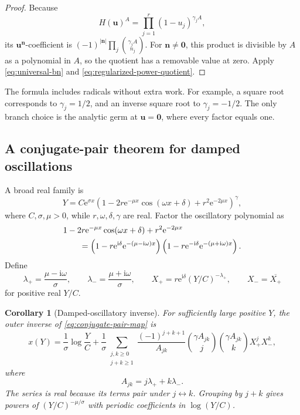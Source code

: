 \documentclass[11pt,oneside]{article}
\theoremstyle{plain}
\newtheorem{corollary}[theorem]{Corollary}
\theoremstyle{definition}
\theoremstyle{remark}
\newcommand{\e}{\mathrm{e}}
\newcommand{\ii}{\mathrm{i}}
\newcommand{\abs}[1]{\left\lvert#1\right\rvert}
\begin{document}
\begin{proof}
Because
\[
 H(\bm u)^A
 =\prod_{j=1}^r(1-u_j)^{\gamma_jA},
\]
its \(\bm u^{\bm n}\)-coefficient is
\((-1)^{\abs{\bm n}}\prod_j\binom{\gamma_jA}{n_j}\).  For
\(\bm n\ne\bm0\), this product is divisible by \(A\) as a polynomial in
\(A\), so the quotient has a removable value at zero.  Apply
\eqref{eq:universal-bn} and \eqref{eq:regularized-power-quotient}.
\end{proof}

The formula includes radicals without extra work.  For example, a square root
corresponds to \(\gamma_j=1/2\), and an inverse square root to
\(\gamma_j=-1/2\).  The only branch choice is the analytic germ at
\(\bm u=\bm0\), where every factor equals one.

\subsection{A conjugate-pair theorem for damped oscillations}

A broad real family is
\begin{equation}
 Y=C\e^{\sigma x}
 \left(1-2r\e^{-\mu x}\cos(\omega x+\delta)
       +r^2\e^{-2\mu x}\right)^\gamma,
 \label{eq:conjugate-pair-map}
\end{equation}
where \(C,\sigma,\mu>0\), while \(r,\omega,\delta,\gamma\) are real.  Factor
the oscillatory polynomial as
\begin{align}
 &1-2r\e^{-\mu x}\cos(\omega x+\delta)+r^2\e^{-2\mu x}
 \notag\\
 &\qquad=
 \left(1-r\e^{\ii\delta}\e^{-(\mu-\ii\omega)x}\right)
 \left(1-r\e^{-\ii\delta}\e^{-(\mu+\ii\omega)x}\right).
 \label{eq:conjugate-factorization}
\end{align}
Define
\begin{equation}
 \lambda_+=\frac{\mu-\ii\omega}{\sigma},
 \qquad
 \lambda_-=\frac{\mu+\ii\omega}{\sigma},
 \qquad
 X_+=r\e^{\ii\delta}(Y/C)^{-\lambda_+},
 \qquad
 X_-=\overline{X_+}
 \label{eq:conjugate-parameters}
\end{equation}
for positive real \(Y/C\).

\begin{corollary}[Damped-oscillatory inverse]
\label{cor:damped-oscillatory}
For sufficiently large positive \(Y\), the outer inverse of
\eqref{eq:conjugate-pair-map} is
\begin{equation}
 \boxed{
 x(Y)=\frac1\sigma\log\frac YC
 +\frac1\sigma\sum_{\substack{j,k\ge0\\j+k\ge1}}
 \frac{(-1)^{j+k+1}}{A_{jk}}
 \binom{\gamma A_{jk}}j
 \binom{\gamma A_{jk}}k
 X_+^jX_-^k,}
 \label{eq:damped-oscillatory-inverse}
\end{equation}
where
\begin{equation}
 A_{jk}=j\lambda_++k\lambda_-.
 \label{eq:damped-Ajk}
\end{equation}
The series is real because its terms pair under \(j\leftrightarrow k\).
Grouping by \(j+k\) gives powers of
\((Y/C)^{-\mu/\sigma}\) with periodic coefficients in \(\log(Y/C)\).
\end{corollary}
\end{document}
